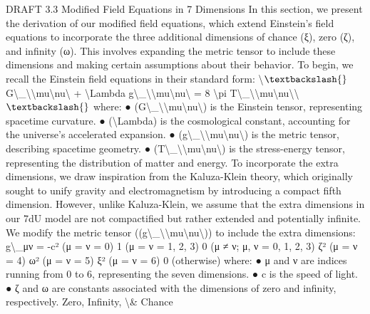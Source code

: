 \documentclass[12pt]{article}
\begin{document}
DRAFT
3.3 Modiﬁed Field Equations in 7 Dimensions
In this section, we present the derivation of our modiﬁed ﬁeld equations, which extend
Einstein's ﬁeld equations to incorporate the three additional dimensions of chance (ξ),
zero (ζ), and inﬁnity (ω). This involves expanding the metric tensor to include these
dimensions and making certain assumptions about their behavior.
To begin, we recall the Einstein ﬁeld equations in their standard form:
\textbackslash{}$\textbackslash{}$G\textbackslash{}_\textbackslash{}{\textbackslash{}mu\textbackslash{}nu\textbackslash{}} + \textbackslash{}Lambda g\textbackslash{}_\textbackslash{}{\textbackslash{}mu\textbackslash{}nu\textbackslash{}} = 8 \textbackslash{}pi T\textbackslash{}_\textbackslash{}{\textbackslash{}mu\textbackslash{}nu\textbackslash{}}\textbackslash{}$\textbackslash{}$
where:
●
(G\textbackslash{}_\textbackslash{}{\textbackslash{}mu\textbackslash{}nu\textbackslash{}}) is the Einstein tensor, representing spacetime curvature.
●
(\textbackslash{}Lambda) is the cosmological constant, accounting for the universe's
accelerated expansion.
●
(g\textbackslash{}_\textbackslash{}{\textbackslash{}mu\textbackslash{}nu\textbackslash{}}) is the metric tensor, describing spacetime geometry.
●
(T\textbackslash{}_\textbackslash{}{\textbackslash{}mu\textbackslash{}nu\textbackslash{}}) is the stress-energy tensor, representing the distribution of matter
and energy.
To incorporate the extra dimensions, we draw inspiration from the Kaluza-Klein theory,
which originally sought to unify gravity and electromagnetism by introducing a compact
ﬁfth dimension. However, unlike Kaluza-Klein, we assume that the extra dimensions in
our 7dU model are not compactiﬁed but rather extended and potentially inﬁnite.
We modify the metric tensor ((g\textbackslash{}_\textbackslash{}{\textbackslash{}mu\textbackslash{}nu\textbackslash{}})) to include the extra dimensions:
g\textbackslash{}_μν =
-c²
(μ = ν = 0)
1
(μ = ν = 1, 2, 3)
0
(μ ≠ ν; μ, ν = 0, 1, 2, 3)
ζ²
(μ = ν = 4)
ω²
(μ = ν = 5)
ξ²
(μ = ν = 6)
0
(otherwise)
where:
●
μ and ν are indices running from 0 to 6, representing the seven dimensions.
●
c is the speed of light.
●
ζ and ω are constants associated with the dimensions of zero and inﬁnity,
respectively.
Zero, Infinity, \textbackslash{}& Chance
\end{document}
